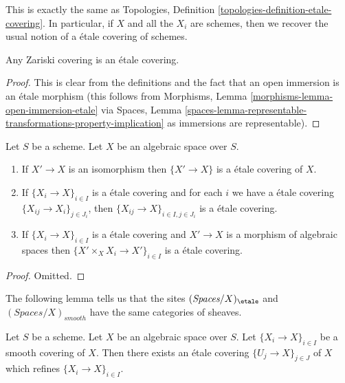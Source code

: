 \noindent
This is exactly the same as
Topologies, Definition \ref{topologies-definition-etale-covering}.
In particular, if $X$ and all the $X_i$ are schemes, then we recover the
usual notion of a \'etale covering of schemes.

\begin{lemma}
\label{lemma-zariski-etale}
Any Zariski covering is an \'etale covering.
\end{lemma}

\begin{proof}
This is clear from the definitions and the fact that an open immersion
is an \'etale morphism (this follows from
Morphisms, Lemma \ref{morphisms-lemma-open-immersion-etale} via
Spaces, Lemma
\ref{spaces-lemma-representable-transformations-property-implication}
as immersions are representable).
\end{proof}

\begin{lemma}
\label{lemma-etale}
Let $S$ be a scheme.
Let $X$ be an algebraic space over $S$.
\begin{enumerate}
\item If $X' \to X$ is an isomorphism then $\{X' \to X\}$
is a \'etale covering of $X$.
\item If $\{X_i \to X\}_{i\in I}$ is a \'etale covering and for each
$i$ we have a \'etale covering $\{X_{ij} \to X_i\}_{j\in J_i}$, then
$\{X_{ij} \to X\}_{i \in I, j\in J_i}$ is a \'etale covering.
\item If $\{X_i \to X\}_{i\in I}$ is a \'etale covering
and $X' \to X$ is a morphism of algebraic spaces then
$\{X' \times_X X_i \to X'\}_{i\in I}$ is a \'etale covering.
\end{enumerate}
\end{lemma}

\begin{proof}
Omitted.
\end{proof}

\noindent
The following lemma tells us that the sites
$(\textit{Spaces}/X)_\etale$ and $(\textit{Spaces}/X)_{smooth}$
have the same categories of sheaves.

\begin{lemma}
\label{lemma-etale-dominates-smooth}
Let $S$ be a scheme. Let $X$ be an algebraic space over $S$.
Let $\{X_i \to X\}_{i \in I}$ be a smooth covering of $X$.
Then there exists an \'etale covering $\{U_j \to X\}_{j \in J}$
of $X$ which refines $\{X_i \to X\}_{i \in I}$.
\end{lemma}

